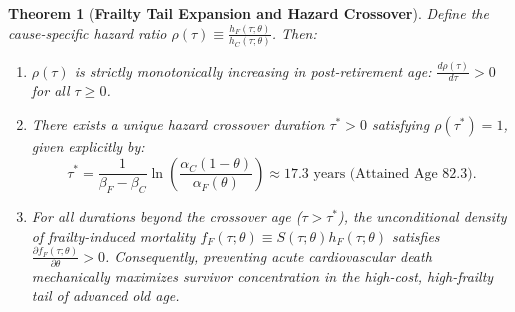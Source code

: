 \documentclass[11pt,a4paper]{article}
\newtheorem{theorem}{Theorem}
\begin{document}
\begin{theorem}[\textbf{Frailty Tail Expansion and Hazard Crossover}]
\label{thm:frailty_expansion}
Define the cause-specific hazard ratio $\rho(\tau) \equiv \frac{h_F(\tau; \theta)}{h_C(\tau; \theta)}$. Then:
\begin{enumerate}
    \item $\rho(\tau)$ is strictly monotonically increasing in post-retirement age: $\frac{d\rho(\tau)}{d\tau} > 0$ for all $\tau \ge 0$.
    \item There exists a unique hazard crossover duration $\tau^* > 0$ satisfying $\rho(\tau^*) = 1$, given explicitly by:
    \begin{equation}
        \tau^* = \frac{1}{\beta_F - \beta_C} \ln\left( \frac{\alpha_C (1 - \theta)}{\alpha_F(\theta)} \right) \approx 17.3 \text{ years (Attained Age } 82.3 \text{)}.
    \end{equation}
    \item For all durations beyond the crossover age ($\tau > \tau^*$), the unconditional density of frailty-induced mortality $f_F(\tau; \theta) \equiv S(\tau; \theta) h_F(\tau; \theta)$ satisfies $\frac{\partial f_F(\tau; \theta)}{\partial \theta} > 0$. Consequently, preventing acute cardiovascular death mechanically maximizes survivor concentration in the high-cost, high-frailty tail of advanced old age.
\end{enumerate}
\end{theorem}
\end{document}
